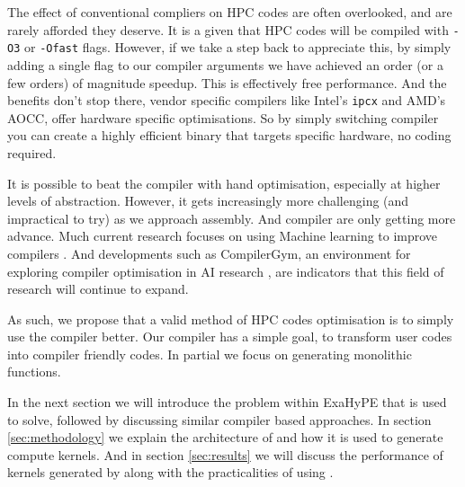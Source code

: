 The effect of conventional compliers on HPC codes are often overlooked, and are rarely afforded they deserve.
It is a given that HPC codes will be compiled with \texttt{-O3} or \texttt{-Ofast} flags.
However, if we take a step back to appreciate this, by simply adding a single flag to our compiler arguments we have achieved an order (or a few orders) of magnitude speedup.
This is effectively free performance.
And the benefits don't stop there, vendor specific compilers like Intel's \texttt{ipcx} and AMD's AOCC, offer hardware specific optimisations.
So by simply switching compiler you can create a highly efficient binary that targets specific hardware, no coding required.

It is possible to beat the compiler with hand optimisation, especially at higher levels of abstraction.
However, it gets increasingly more challenging (and impractical to try) as we approach assembly.
And compiler are only getting more advance.   
Much current research focuses on using Machine learning to improve compilers \cite{compiler-ml-opt,lots-of-compiler-options}.
And developments such as CompilerGym, an environment for exploring compiler optimisation in AI research \cite{compiler-gym}, are indicators that this field of research will continue to expand. 

As such, we propose that a valid method of HPC codes optimisation is to simply use the compiler better.
Our \phlat compiler has a simple goal, to transform user codes into compiler friendly codes.    
In partial we focus on generating monolithic functions.

In the next section we will introduce the problem within ExaHyPE that \phlat is used to solve, followed by discussing similar compiler based approaches.
In section \ref{sec:methodology} we explain the architecture of \phlat and how it is used to generate compute kernels.
And in section \ref{sec:results} we will discuss the performance of kernels generated by \phlat along with the practicalities of using \phlat. 